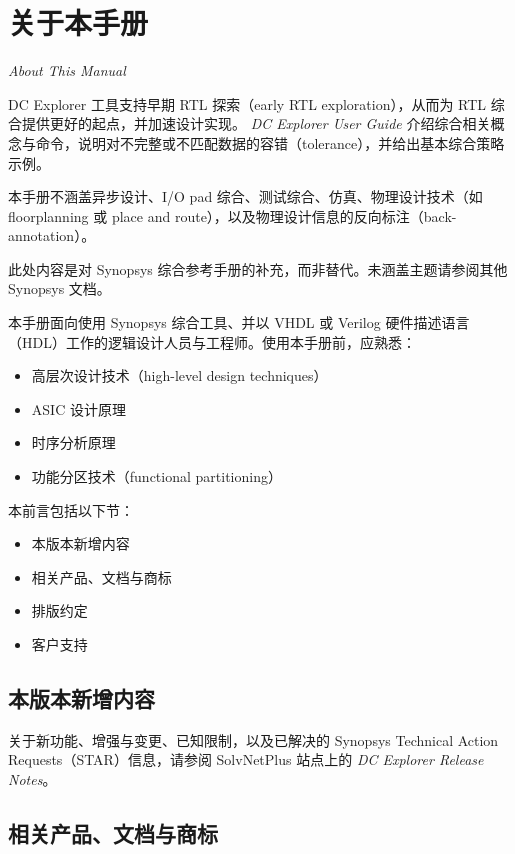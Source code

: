 \chapter*{关于本手册}

\noindent\textit{About This Manual}

DC Explorer 工具支持早期 RTL 探索（early RTL exploration），从而为 RTL 综合提供更好的起点，并加速设计实现。
\textit{DC Explorer User Guide} 介绍综合相关概念与命令，说明对不完整或不匹配数据的容错（tolerance），并给出基本综合策略示例。

本手册不涵盖异步设计、I/O pad 综合、测试综合、仿真、物理设计技术（如 floorplanning 或 place and route），以及物理设计信息的反向标注（back-annotation）。

此处内容是对 Synopsys 综合参考手册的补充，而非替代。未涵盖主题请参阅其他 Synopsys 文档。

本手册面向使用 Synopsys 综合工具、并以 VHDL 或 Verilog 硬件描述语言（HDL）工作的逻辑设计人员与工程师。使用本手册前，应熟悉：
\begin{itemize}
  \item 高层次设计技术（high-level design techniques）
  \item ASIC 设计原理
  \item 时序分析原理
  \item 功能分区技术（functional partitioning）
\end{itemize}

本前言包括以下节：
\begin{itemize}
  \item 本版本新增内容
  \item 相关产品、文档与商标
  \item 排版约定
  \item 客户支持
\end{itemize}

\section*{本版本新增内容}

关于新功能、增强与变更、已知限制，以及已解决的 Synopsys Technical Action Requests（STAR）信息，请参阅 SolvNetPlus 站点上的
\textit{DC Explorer Release Notes}。

\section*{相关产品、文档与商标}

